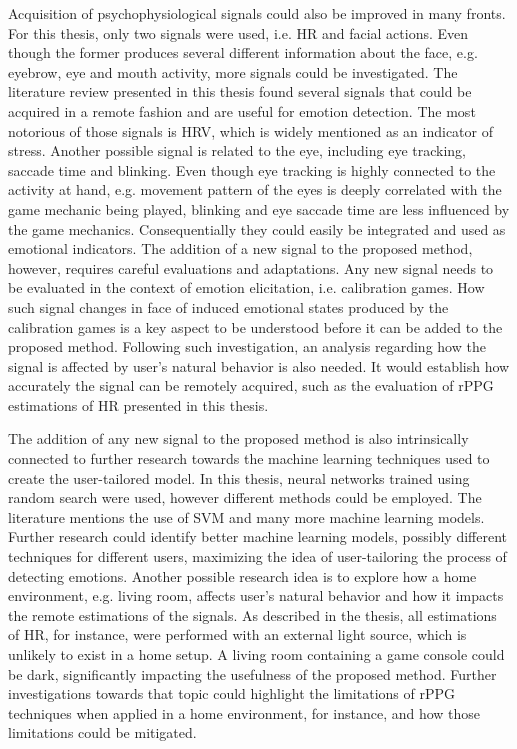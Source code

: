 Acquisition of psychophysiological signals could also be improved in many fronts. For this thesis, only two signals were used, i.e. HR and facial actions. Even though the former produces several different information about the face, e.g. eyebrow, eye and mouth activity, more signals could be investigated. The literature review presented in this thesis found several signals that could be acquired in a remote fashion and are useful for emotion detection. The most notorious of those signals is HRV, which is widely mentioned as an indicator of stress. Another possible signal is related to the eye, including eye tracking, saccade time and blinking. Even though eye tracking is highly connected to the activity at hand, e.g. movement pattern of the eyes is deeply correlated with the game mechanic being played, blinking and eye saccade time are less influenced by the game mechanics. Consequentially they could easily be integrated and used as emotional indicators. The addition of a new signal to the proposed method, however, requires careful evaluations and adaptations. Any new signal needs to be evaluated in the context of emotion elicitation, i.e. calibration games. How such signal changes in face of induced emotional states produced by the calibration games is a key aspect to be understood before it can be added to the proposed method. Following such investigation, an analysis regarding how the signal is affected by user's natural behavior is also needed. It would establish how accurately the signal can be remotely acquired, such as the evaluation of rPPG estimations of HR presented in this thesis.

The addition of any new signal to the proposed method is also intrinsically connected to further research towards the machine learning techniques used to create the user-tailored model. In this thesis, neural networks trained using random search were used, however different methods could be employed. The literature mentions the use of SVM and many more machine learning models. Further research could identify better machine learning models, possibly different techniques for different users, maximizing the idea of user-tailoring the process of detecting emotions. Another possible research idea is to explore how a home environment, e.g. living room, affects user's natural behavior and how it impacts the remote estimations of the signals. As described in the thesis, all estimations of HR, for instance, were performed with an external light source, which is unlikely to exist in a home setup. A living room containing a game console could be dark, significantly impacting the usefulness of the proposed method. Further investigations towards that topic could highlight the limitations of rPPG techniques when applied in a home environment, for instance, and how those limitations could be mitigated.

